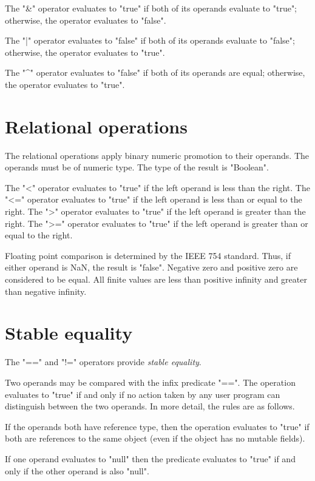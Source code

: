 The \xcd"&" operator  evaluates to \xcd"true" if both of its
operands evaluate to \xcd"true"; otherwise, the operator
evaluates to \xcd"false".

The \xcd"|" operator  evaluates to \xcd"false" if both of its
operands evaluate to \xcd"false"; otherwise, the operator
evaluates to \xcd"true".

The \xcd"^" operator  evaluates to \xcd"false" if both of its
operands are equal; otherwise, the operator
evaluates to \xcd"true".

\section{Relational operations} 

The relational operations apply binary numeric promotion
to their operands. The operands must be of numeric type.
The type of the result is \xcd"Boolean".

The \xcd"<" operator evaluates to \xcd"true" if the left operand is
less than the right.
The \xcd"<=" operator evaluates to \xcd"true" if the left operand is
less than or equal to the right.
The \xcd">" operator evaluates to \xcd"true" if the left operand is
greater than the right.
The \xcd">=" operator evaluates to \xcd"true" if the left operand is
greater than or equal to the right.

Floating point comparison is determined by the IEEE 754
standard.  Thus,
if either operand is NaN, the result is \xcd"false".
Negative zero and positive zero are considered to be equal.
All finite values are less than positive infinity and greater
than negative infinity.

\section{Stable equality}\label{StableEquality}\index{==}\index{!=}

The \xcd"==" and \xcd"!=" operators provide \emph{stable equality}.

Two operands may be compared with the infix predicate \xcd"==".
The operation
evaluates to \xcd"true" if and only if no action taken by any
user program can distinguish between the two operands.  In more detail,
the rules are as follows.

If the operands both have reference type, then the operation
evaluates to \xcd"true" if both are references to
the same object (even if the object has no mutable fields). 

If one operand evaluates to \xcd"null" then the predicate
evaluates to \xcd"true" if and only if the
other operand is also \xcd"null".

